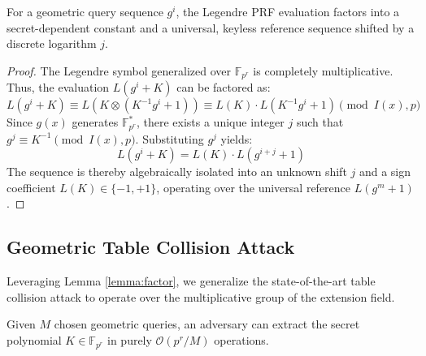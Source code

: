 \documentclass[runningheads]{llncs}
\begin{document}
\begin{lemma} \label{lemma:factor}
For a geometric query sequence $g^i$, the Legendre PRF evaluation factors into a secret-dependent constant and a universal, keyless reference sequence shifted by a discrete logarithm $j$.
\end{lemma}

\begin{proof}
The Legendre symbol generalized over $\mathbb{F}_{p^r}$ is completely multiplicative. Thus, the evaluation $L(g^i + K)$ can be factored as:
\begin{equation*}
    L(g^i + K) \equiv L\left( K \otimes (K^{-1}g^i + 1) \right) \equiv L(K) \cdot L(K^{-1}g^i + 1) \pmod{I(x), p}
\end{equation*}
Since $g(x)$ generates $\mathbb{F}_{p^r}^*$, there exists a unique integer $j$ such that $g^j \equiv K^{-1} \pmod{I(x), p}$. Substituting $g^j$ yields:
\begin{equation*}
    L(g^i + K) = L(K) \cdot L(g^{i+j} + 1)
\end{equation*}
The sequence is thereby algebraically isolated into an unknown shift $j$ and a sign coefficient $L(K) \in \{-1, +1\}$, operating over the universal reference $L(g^m + 1)$.
\end{proof}

\subsection{Geometric Table Collision Attack}
Leveraging Lemma \ref{lemma:factor}, we generalize the state-of-the-art table collision attack \cite{beullens2019} to operate over the multiplicative group of the extension field.

\begin{theorem} \label{thm:active}
Given $M$ chosen geometric queries, an adversary can extract the secret polynomial $K \in \mathbb{F}_{p^r}$ in purely $\mathcal{O}(p^r / M)$ operations.
\end{theorem}
\end{document}
